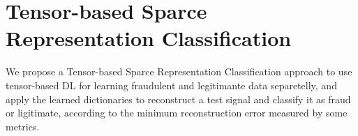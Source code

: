 





\section{Tensor-based Sparce Representation Classification}
\label{sec:4_proposal}

We propose a Tensor-based Sparce Representation Classification approach to use tensor-based DL for learning fraudulent and legitimante data separetelly, and apply the learned dictionaries to reconstruct a test signal and classify it as fraud or ligitimate, according to the minimum reconstruction error measured by some metrics.


